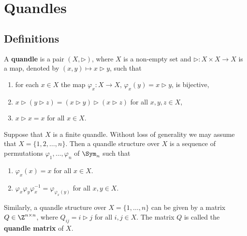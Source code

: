 \chapter{Quandles}

\section{Definitions}





\begin{block}
	A \textbf{quandle} is a pair $(X,\triangleright)$, where $X$ is a non-empty
	set and $\triangleright\colon X\times X\to X$ is a map, denoted by
	$(x,y)\mapsto x\triangleright y$, such that 
    \begin{enumerate}
        \item for each $x\in X$ the map $\varphi_x\colon X\to X$, 
            $\varphi_x(y)=x\triangleright y$, is bijective, 
        \item  $x\triangleright (y\triangleright z)=(x\triangleright
            y)\triangleright (x\triangleright z)$ for all $x,y,z\in X$,
        \item $x\triangleright x=x$ for all $x\in X$.
    \end{enumerate}
\end{block}

\begin{block}
	Suppose that $X$ is a finite quandle. Without loss of generality we may
	assume that $X=\{1,2,\dots,n\}$. Then a quandle structure over $X$ is a
	sequence of permutations $\varphi_1,\dots,\varphi_n$ of $\Sym_n$ such that 
    \begin{enumerate}
        \item $\varphi_x(x)=x$ for all $x\in X$.
        \item $\varphi_x\varphi_y\varphi_x^{-1}=\varphi_{\varphi_x(y)}$ for all $x,y\in X$.
    \end{enumerate}
	Similarly, a quandle structure over $X=\{1,\dots,n\}$ can be given by a
	matrix $Q\in\Z^{n\times n}$, where $Q_{ij}=i\triangleright j$ for all
	$i,j\in X$. The matrix $Q$ is called the \textbf{quandle matrix} of $X$.
\end{block}


